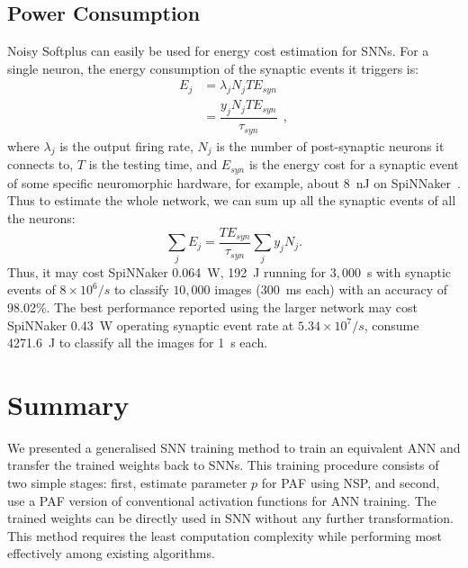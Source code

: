 	
	\subsection{Power Consumption}
	Noisy Softplus can easily be used for energy cost estimation for SNNs.
	For a single neuron, the energy consumption of the synaptic events it triggers is:
	\begin{equation}
	\begin{aligned}
	E_{j} &= \lambda_j N_j T E_{syn}\\
	&= \dfrac{y_j N_j T E_{syn}}{\tau_{syn}}~~,
	\end{aligned}
	\label{equ:energy}
	\end{equation}
	where $\lambda_j$ is the output firing rate, $N_j$ is the number of post-synaptic neurons it connects to, $T$ is the testing time, and $E_{syn}$ is the energy cost for a synaptic event of some specific neuromorphic hardware, for example, about 8~nJ on SpiNNaker~\DIFdelbegin {}\DIFdelend \DIFaddbegin {}\DIFaddend .
	Thus to estimate the whole network, we can sum up all the synaptic events of all the neurons:
	\begin{equation}
	\sum_j E_{j} =  \dfrac{T E_{syn}}{\tau_{syn}} \sum_{j}y_j N_j.
	\end{equation}
	Thus, it may cost SpiNNaker 0.064~W, 192~J running for $3,000$~s with synaptic events of $8\times10^6/s$ to classify $10,000$ images (300~ms each) with an accuracy of 98.02\%.
	The best performance reported using the larger network may cost SpiNNaker 0.43~W operating synaptic event rate at $5.34\times10^7/s$, consume 4271.6~J to classify all the images for 1~s each.

\section{Summary}
	We presented a generalised SNN training method to train an equivalent ANN and transfer the trained weights back to SNNs.
	This training procedure consists of two simple stages: first, estimate parameter $p$ for PAF using NSP, and second, use a PAF version of conventional activation functions for ANN training. %
	The trained weights can be directly used in \DIFaddbegin {}\DIFaddend SNN without any further transformation.
	This method requires the least computation complexity while performing most effectively among existing algorithms.

